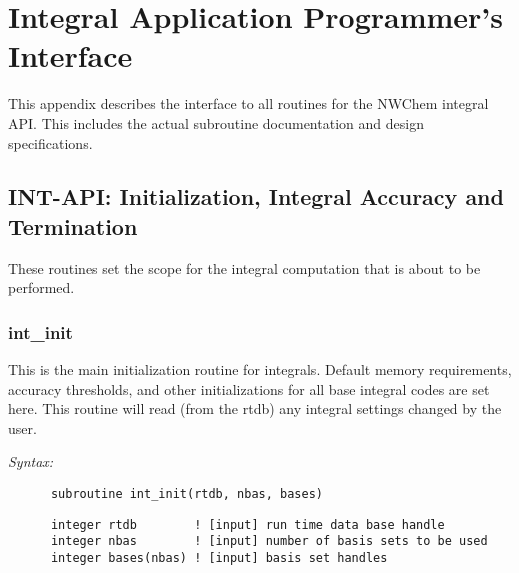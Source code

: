 %
%
\chapter{Integral Application Programmer's Interface} 
\label{appendix_intapi} 
This appendix describes the interface to all routines for the NWChem 
integral API. This includes the actual subroutine documentation and 
design specifications. 
 
 
\section{INT-API: Initialization, Integral Accuracy and Termination} 
These routines set the scope for the integral computation that is 
about to be performed.  
% 
 
\subsection{int\_init} 
This is the main initialization routine for integrals. 
Default memory requirements, accuracy thresholds, and other  
initializations for all base integral codes are set here.  
This routine will read (from the rtdb) any integral  
settings changed by the user. 
 
{\it Syntax:} 
\begin{verbatim} 
      subroutine int_init(rtdb, nbas, bases) 
\end{verbatim} 
\begin{verbatim} 
      integer rtdb        ! [input] run time data base handle 
      integer nbas        ! [input] number of basis sets to be used 
      integer bases(nbas) ! [input] basis set handles 
\end{verbatim} 
